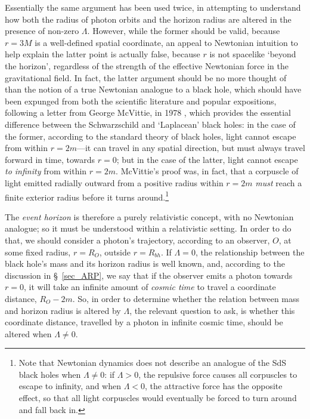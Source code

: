Essentially the same argument has been used twice, in attempting to understand how both the radius of photon orbits and the horizon radius are altered in the presence of non-zero $\Lambda$. However, while the former should be valid, because $r=3M$ is a well-defined spatial coordinate, an appeal to Newtonian intuition to help explain the latter point is actually false, because $r$ is not spacelike `beyond the horizon', regardless of the strength of the effective Newtonian force in the gravitational field. In fact, the latter argument should be no more thought of than the notion of a true Newtonian analogue to a black hole, which should have been expunged from both the scientific literature and popular expositions, following a letter from George McVittie, in 1978 \cite{McVittie1978}, which provides the essential difference between the Schwarzschild and `Laplacean' black holes: in the case of the former, according to the standard theory of black holes, light cannot escape from within $r=2m$---it can travel in any spatial direction, but must always travel forward in time, towards $r=0$; but in the case of the latter, light cannot escape \textit{to infinity} from within $r=2m$. McVittie's proof was, in fact, that a corpuscle of light emitted radially outward from a positive radius within $r=2m$ \textit{must} reach a finite exterior radius before it turns around.\footnote{Note that Newtonian dynamics does not describe an analogue of the SdS black holes when $\Lambda\neq0$: if $\Lambda>0$, the repulsive force causes all corpuscles to escape to infinity, and when $\Lambda<0$, the attractive force has the opposite effect, so that all light corpuscles would eventually be forced to turn around and fall back in.}

The \textit{event horizon} is therefore a purely relativistic concept, with no Newtonian analogue; so it must be understood within a relativistic setting. In order to do that, we should consider a photon's trajectory, according to an observer, $O$, at some fixed radius, $r=R_O$, outside $r=R_{bh}$. If $\Lambda=0$, the relationship between the black hole's mass and its horizon radius is well known, and, according to the discussion in \S~\ref{sec_ARP}, we say that if the observer emits a photon towards $r=0$, it will take an infinite amount of \textit{cosmic time} to travel a coordinate distance, $R_O-2m$. So, in order to determine whether the relation between mass and horizon radius is altered by $\Lambda$, the relevant question to ask, is whether this coordinate distance, travelled by a photon in infinite cosmic time, should be altered when $\Lambda\neq0$.

